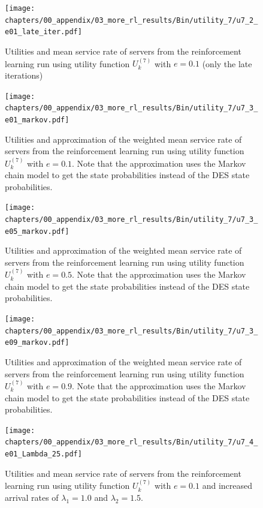 \begin{figure}[H]
    \texttt{[image: chapters/00\_appendix/03\_more\_rl\_results/Bin/utility\_7/u7\_2\_e01\_late\_iter.pdf]}
    \caption{Utilities and mean service rate of servers from the reinforcement
    learning run using utility function \(U_k^{(7)}\) with \(e = 0.1\) (only
    the late iterations)}
    \label{fig:RL_utility7_2_e01_late_iter}
\end{figure}

\begin{figure}[H]
    \texttt{[image: chapters/00\_appendix/03\_more\_rl\_results/Bin/utility\_7/u7\_3\_e01\_markov.pdf]}
    \caption{Utilities and approximation of the weighted mean service rate of
    servers from the reinforcement learning run using utility function
    \(U_k^{(7)}\) with \(e = 0.1\). Note that the approximation uses the Markov
    chain model to get the state probabilities instead of the DES state
    probabilities.}
    \label{fig:RL_utility7_3_e01_markov}
\end{figure}

\begin{figure}[H]
    \texttt{[image: chapters/00\_appendix/03\_more\_rl\_results/Bin/utility\_7/u7\_3\_e05\_markov.pdf]}
    \caption{Utilities and approximation of the weighted mean service rate of
    servers from the reinforcement learning run using utility function
    \(U_k^{(7)}\) with \(e = 0.5\). Note that the approximation uses the Markov
    chain model to get the state probabilities instead of the DES state
    probabilities.}
    \label{fig:RL_utility7_3_e05_markov}
\end{figure}

\begin{figure}[H]
    \texttt{[image: chapters/00\_appendix/03\_more\_rl\_results/Bin/utility\_7/u7\_3\_e09\_markov.pdf]}
    \caption{Utilities and approximation of the weighted mean service rate of
    servers from the reinforcement learning run using utility function
    \(U_k^{(7)}\) with \(e = 0.9\). Note that the approximation uses the Markov
    chain model to get the state probabilities instead of the DES state
    probabilities.}
    \label{fig:RL_utility7_3_e09_markov}
\end{figure}


\begin{figure}[H]
    \texttt{[image: chapters/00\_appendix/03\_more\_rl\_results/Bin/utility\_7/u7\_4\_e01\_Lambda\_25.pdf]}
    \caption{Utilities and mean service rate of servers from the reinforcement
    learning run using utility function \(U_k^{(7)}\) with \(e = 0.1\) and
    increased arrival rates of \(\lambda_1 = 1.0\) and \(\lambda_2 = 1.5\).}
    \label{fig:RL_utility7_4_e01_Lambda_25}
\end{figure}

